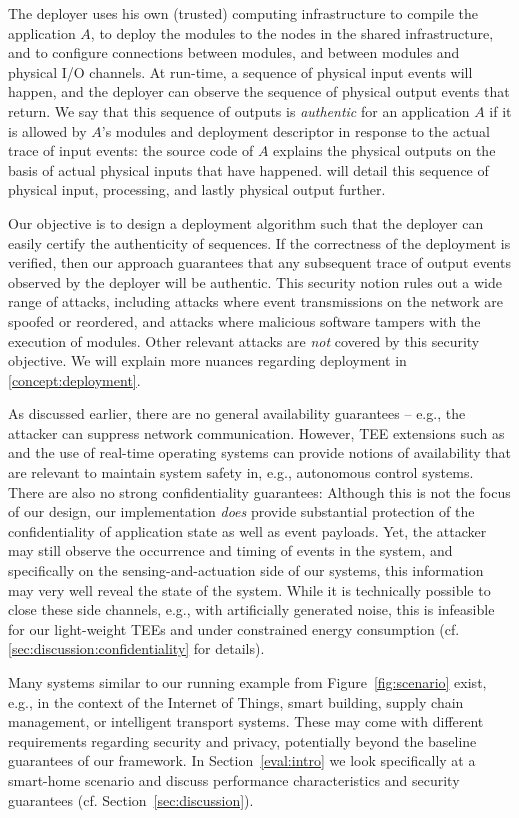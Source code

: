 The deployer uses his own (trusted) computing infrastructure to compile the
application $A$, to deploy the modules to the nodes in the shared
infrastructure, and to configure connections between modules, and between
modules and physical I/O channels. At run-time, a sequence of physical input
events will happen, and the deployer can observe the sequence of physical output
events that return. We say that this sequence of outputs is \emph{authentic} for
an application $A$ if it is allowed by $A$'s modules and deployment descriptor
in response to the actual trace of input events: the source code of $A$ explains
the physical outputs on the basis of actual physical inputs that have happened.
 will detail this sequence of physical input,
processing, and lastly physical output further.

Our objective is to design a deployment algorithm such that the deployer can
easily certify the authenticity of sequences. If the correctness of the
deployment is verified, then our approach guarantees that any subsequent trace
of output events observed by the deployer will be authentic.
%
This security notion rules out a wide range of attacks, including attacks where
event transmissions on the network are spoofed or reordered, and attacks where
malicious software tampers with the execution of modules. Other relevant attacks
are \emph{not} covered by this security objective. We will explain more nuances
regarding deployment in \cref{concept:deployment}.

As discussed earlier, there are no general availability guarantees -- e.g., the
attacker can suppress network communication. However, \ac{TEE} extensions such
as~\cite{alder_2021_aion} and the use of real-time operating systems can provide
notions of availability that are relevant to maintain system safety in, e.g.,
autonomous control systems. There are also no strong confidentiality guarantees:
Although this is not the focus of our design, our implementation \emph{does}
provide substantial protection of the confidentiality of application state as
well as event payloads. Yet, the attacker may still observe the occurrence and
timing of events in the system, and specifically on the sensing-and-actuation
side of our systems, this information may very well reveal the state of the
system. While it is technically possible to close these side channels, e.g.,
with artificially generated noise, this is infeasible for our light-weight
\acp{TEE} and under constrained energy consumption (cf.
\cref{sec:discussion:confidentiality} for details).

Many systems similar to our running example from Figure~\ref{fig:scenario}
exist, e.g., in the context of the Internet of Things, smart building, supply
chain management, or intelligent transport systems. These may come with
different requirements regarding security and privacy, potentially beyond the
baseline guarantees of our framework. In Section~\ref{eval:intro} we look
specifically at a smart-home scenario and discuss performance characteristics
and security guarantees (cf. Section~\ref{sec:discussion}).
